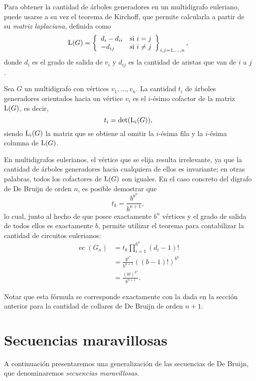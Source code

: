 Para obtener la cantidad de árboles generadores en un multidigrafo euleriano,
puede usarse a su vez el teorema de Kirchoff, que permite calcularla
a partir de su \emph{matriz laplaciana}, definida como
\[ \operatorname{L}(G) = \left\lbrace \begin{array}{ll}
	d_i - d_{ii} & \text{si $i = j$} \\
	-d_{ij}       & \text{si $i \neq j$}
\end{array} \right\rbrace_{i,j = 1,\dots,n}, \]
donde $d_i$ es el grado de salida de $v_i$ y $d_{ij}$ es la cantidad de
aristas que van de $i$ a $j$.

\begin{theorem*}
	Sea $G$ un multidigrafo con vértices $v_1, \dots, v_n$. La cantidad $t_i$
	de árboles generadores orientados hacia un vértice $v_i$ es el $i$-ésimo
	cofactor de la matriz $\operatorname{L}(G)$, es decir,
	\[ t_i = \operatorname{det}(\operatorname{L}_i(G)), \]
	siendo $\operatorname{L}_i(G)$ la matriz que se obtiene al omitir la $i$-ésima fila
	y la $i$-ésima columna de $\operatorname{L}(G)$.
\end{theorem*}

En multidigrafos eulerianos, el vértice que se elija resulta irrelevante, ya
que la cantidad de árboles generadores hacia cualquiera de ellos es invariante;
en otras palabras, todos los cofactores de $\operatorname{L}(G)$ son iguales. En
el caso concreto del digrafo de De Bruijn de orden $n$, es posible demostrar
\pending{[cita]} que
\[ t_k = \frac{b^{b^{n}}}{b^{n+1}}, \]
lo cual, junto al hecho de que posee exactamente $b^n$ vértices y el grado de
salida de todos ellos es exactamente $b$, permite utilizar el teorema \BEST{} para
contabilizar la cantidad de circuitos eulerianos:
\begin{align*}
	\operatorname{ec}(G_n) &= t_k \prod_{i=1}^{b^n} (d_i - 1)! \\
		&= \frac{b^{b^{n}}}{b^{n+1}} \left((b - 1)!\right)^{b^n} \\
		&= \frac{(b!)^{b^{n}}}{b^{n+1}}.
\end{align*}

Notar que esta fórmula se corresponde exactamente con la dada en la sección
anterior para la cantidad de collares de De Bruijn de orden $n + 1$.

\section{Secuencias maravillosas}

A continuación presentaremos una generalización de las secuencias de De Bruijn,
que denominaremos \emph{secuencias maravillosas}.

